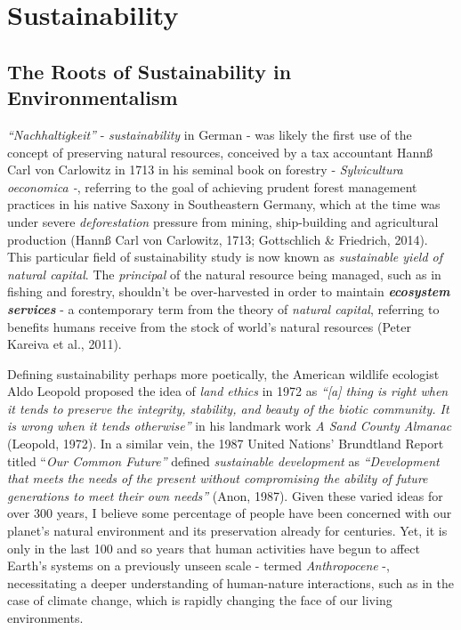 \documentclass[
  letterpaper,
  DIV=11,
  numbers=noendperiod]{scrartcl}
\begin{document}
\newpage

\section{Sustainability}\label{sustainability}

\subsection{The Roots of Sustainability in
Environmentalism}\label{the-roots-of-sustainability-in-environmentalism}

\emph{``Nachhaltigkeit''} - \emph{sustainability} in German - was likely
the first use of the concept of preserving natural resources, conceived
by a tax accountant Hannß Carl von Carlowitz in 1713 in his seminal book
on forestry - \emph{Sylvicultura oeconomica -}, referring to the goal of
achieving prudent forest management practices in his native Saxony in
Southeastern Germany, which at the time was under severe
\emph{deforestation} pressure from mining, ship-building and
agricultural production (Hannß Carl von Carlowitz, 1713; Gottschlich \&
Friedrich, 2014). This particular field of sustainability study is now
known as \emph{sustainable yield of natural capital}. The
\emph{principal} of the natural resource being managed, such as in
fishing and forestry, shouldn't be over-harvested in order to maintain
\textbf{\emph{ecosystem services}} - a contemporary term from the theory
of \emph{natural capital}, referring to benefits humans receive from the
stock of world's natural resources (Peter Kareiva et al., 2011).

Defining sustainability perhaps more poetically, the American wildlife
ecologist Aldo Leopold proposed the idea of \emph{land ethics} in 1972
as \emph{``{[}a{]} thing is right when it tends to preserve the
integrity, stability, and beauty of the biotic community. It is wrong
when it tends otherwise''} in his landmark work \emph{A Sand County
Almanac} (Leopold, 1972). In a similar vein, the 1987 United Nations'
Brundtland Report titled ``\emph{Our Common Future''} defined
\emph{sustainable development} as \emph{``Development that meets the
needs of the present without compromising the ability of future
generations to meet their own needs''} (Anon, 1987). Given these varied
ideas for over 300 years, I believe some percentage of people have been
concerned with our planet's natural environment and its preservation
already for centuries. Yet, it is only in the last 100 and so years that
human activities have begun to affect Earth's systems on a previously
unseen scale - termed \emph{Anthropocene} -, necessitating a deeper
understanding of human-nature interactions, such as in the case of
climate change, which is rapidly changing the face of our living
environments.
\end{document}
